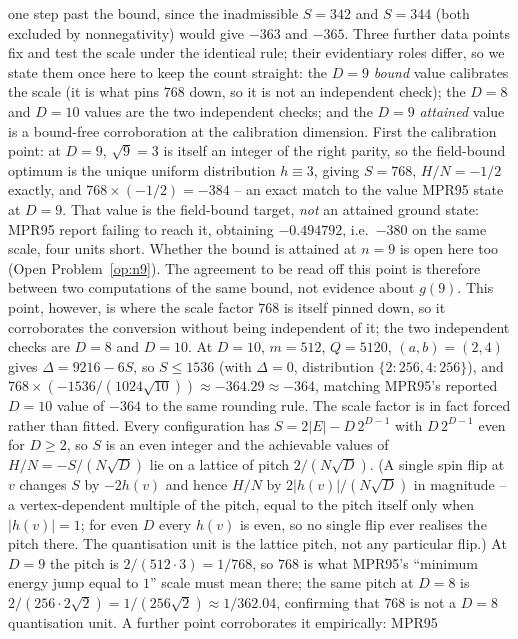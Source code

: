 \documentclass[12pt]{article}
\begin{document}
one step past the bound, since the inadmissible $S=342$ and $S=344$
(both excluded by nonnegativity) would give $-363$ and $-365$. Three
further data points fix and test the scale under the identical rule; their
evidentiary roles differ, so we state them once here to keep the count
straight: the $D=9$ \emph{bound} value calibrates the scale (it is what pins
$768$ down, so it is not an independent check); the $D=8$ and $D=10$ values
are the two independent checks; and the $D=9$ \emph{attained} value is a
bound-free corroboration at the calibration dimension. First the calibration
point: at $D=9$, $\sqrt9=3$ is itself an integer of the right parity,
so the field-bound optimum is the unique uniform distribution $h\equiv3$,
giving $S=768$, $H/N=-1/2$ exactly, and $768\times(-1/2)=-384$ --
an exact match to the value MPR95 state at $D=9$. That value is the
field-bound target, \emph{not} an attained ground state: MPR95 report failing
to reach it, obtaining $-0.494792$, i.e.\ $-380$ on the same scale, four units
short. Whether the bound is attained at $n=9$ is open here too
(Open Problem~\ref{op:n9}). The agreement to be read off this point is
therefore between two computations of the same bound, not evidence about
$g(9)$. This point,
however, is where the scale factor $768$ is itself pinned down, so it
corroborates the conversion without being independent of it; the two
independent checks are $D=8$ and $D=10$. At $D=10$, $m=512$, $Q=5120$, $(a,b)=(2,4)$ gives
$\Delta=9216-6S$, so $S\le1536$ (with $\Delta=0$, distribution
$\{2{:}256,4{:}256\}$), and
$768\times(-1536/(1024\sqrt{10}))\approx-364.29\approx-364$, matching
MPR95's reported $D=10$ value of $-364$ to the same rounding rule. The scale factor is in fact forced rather than fitted. Every configuration
has $S=2|E|-D\,2^{D-1}$ with $D\,2^{D-1}$ even for $D\ge2$, so $S$ is an even
integer and the achievable values of $H/N=-S/(N\sqrt D)$ lie on a lattice of
pitch $2/(N\sqrt D)$. (A single spin flip at $v$ changes $S$ by $-2h(v)$ and
hence $H/N$ by $2|h(v)|/(N\sqrt D)$ in magnitude -- a vertex-dependent
multiple of the pitch, equal to the pitch itself only when $|h(v)|=1$; for
even $D$ every $h(v)$ is even, so no single flip ever realises the pitch
there. The quantisation unit is the lattice pitch, not any particular flip.)
At $D=9$ the pitch is $2/(512\cdot3)=1/768$, so $768$ is what MPR95's
``minimum energy jump equal to $1$'' scale must mean there; the same pitch at
$D=8$ is $2/(256\cdot2\sqrt2)=1/(256\sqrt2)\approx1/362.04$, confirming that
$768$ is not a $D=8$ quantisation unit. A further point
corroborates it empirically: MPR95
\end{document}
